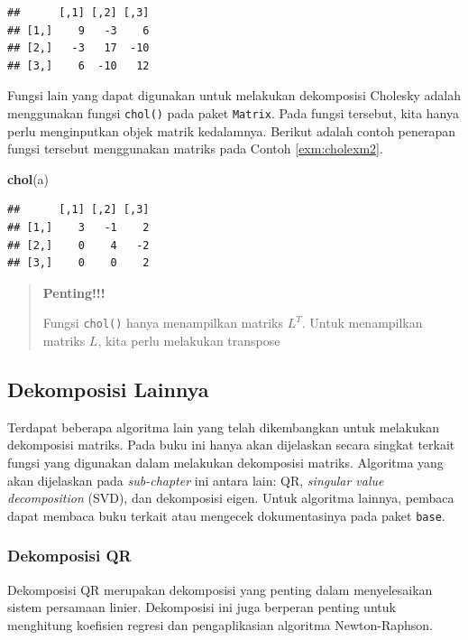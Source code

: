 \documentclass[]{book}
\newenvironment{Shaded}{\begin{snugshade}}{\end{snugshade}}
\newcommand{\KeywordTok}[1]{\textcolor[rgb]{0.13,0.29,0.53}{\textbf{#1}}}
\newcommand{\NormalTok}[1]{#1}
\theoremstyle{definition}
\theoremstyle{definition}
\theoremstyle{definition}
\theoremstyle{remark}
\begin{document}
\begin{verbatim}
##      [,1] [,2] [,3]
## [1,]    9   -3    6
## [2,]   -3   17  -10
## [3,]    6  -10   12
\end{verbatim}

Fungsi lain yang dapat digunakan untuk melakukan dekomposisi Cholesky adalah menggunakan fungsi \texttt{chol()} pada paket \texttt{Matrix}. Pada fungsi tersebut, kita hanya perlu menginputkan objek matrik kedalamnya. Berikut adalah contoh penerapan fungsi tersebut menggunakan matriks pada Contoh \ref{exm:cholexm2}.

\begin{Shaded}
\begin{Highlighting}[]
\KeywordTok{chol}\NormalTok{(a)}
\end{Highlighting}
\end{Shaded}

\begin{verbatim}
##      [,1] [,2] [,3]
## [1,]    3   -1    2
## [2,]    0    4   -2
## [3,]    0    0    2
\end{verbatim}

\begin{quote}
\textbf{Penting!!!}

Fungsi \texttt{chol()} hanya menampilkan matriks \(L^T\). Untuk menampilkan matriks \(L\), kita perlu melakukan transpose
\end{quote}

\hypertarget{othersdecomp}{%
\subsection{Dekomposisi Lainnya}\label{othersdecomp}}

Terdapat beberapa algoritma lain yang telah dikembangkan untuk melakukan dekomposisi matriks. Pada buku ini hanya akan dijelaskan secara singkat terkait fungsi yang digunakan dalam melakukan dekomposisi matriks. Algoritma yang akan dijelaskan pada \emph{sub-chapter} ini antara lain: QR, \emph{singular value decomposition} (SVD), dan dekomposisi eigen. Untuk algoritma lainnya, pembaca dapat membaca buku terkait atau mengecek dokumentasinya pada paket \texttt{base}.

\hypertarget{qrdecomp}{%
\subsubsection{Dekomposisi QR}\label{qrdecomp}}

Dekomposisi QR merupakan dekomposisi yang penting dalam menyelesaikan sistem persamaan linier. Dekomposisi ini juga berperan penting untuk menghitung koefisien regresi dan pengaplikasian algoritma Newton-Raphson.
\end{document}
